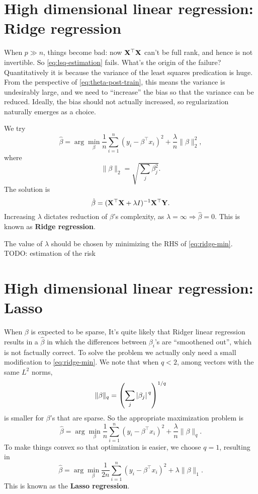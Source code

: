 \documentclass[hyperref, a4paper]{article}
\newcommand*{\argmin}{\arg\min}
\newcommand*{\concept}[1]{{\textbf{#1}}}
\begin{document}
\section{High dimensional linear regression: Ridge regression}

When $p \gg n$, things become bad: now $\vb{X}^\top \vb{X}$ can't be full rank,
and hence is not invertible.
So \eqref{eq:lsq-estimation} fails.
What's the origin of the failure?
Quantitatively it is because the variance of the least squares predication is huge.
From the perspective of \eqref{eq:theta-post-train},
this means the variance is undesirably large,
and we need to ``increase'' the bias so that the variance can be reduced.
Ideally, the bias should not actually increased,
so regularization naturally emerges as a choice.

We try 
\begin{equation}
    \hat{\beta} = \argmin_{\beta} \frac{1}{n} \sum_{i=1}^{n} (y_i - \beta^\top x_i)^2 + \frac{\lambda}{n} \| \beta \|^2_2,
    \label{eq:ridge-min}
\end{equation}
where 
\begin{equation}
    \| \beta \|_2 = \sqrt{\sum_j \beta_j^2}.
\end{equation}
The solution is 
\begin{equation}
    \hat{\beta} = (\vb{X}^\top \vb{X} + \lambda I)^{-1} \vb{X}^\top \vb{Y}.
\end{equation}
Increasing $\lambda$ dictates reduction of $\beta$'s complexity,
as $\lambda = \infty \Rightarrow \hat{\beta} = 0$.
This is known as \concept{Ridge regression}.

The value of $\lambda$ should be chosen by minimizing the RHS of \eqref{eq:ridge-min}. TODO: estimation of the risk 

\section{High dimensional linear regression: Lasso}

When $\beta$ is expected to be sparse,
It's quite likely that Ridger linear regression results in a $\hat{\beta}$
in which the differences between $\beta_i$'s are ``smoothened out'',
which is not factually correct.
To solve the problem we actually only need a small modification to \eqref{eq:ridge-min}.
We note that when $q < 2$, among vectors with the same $L^2$ norms,
\begin{equation}
    \| \beta \|_q = \left( \sum_j \abs*{\beta_j}^q \right)^{1/q}
\end{equation}
is smaller for $\beta$'s that are sparse.
So the appropriate maximization problem is 
\begin{equation}
    \hat{\beta} = \argmin_{\beta} \frac{1}{n} \sum_{i=1}^{n} (y_i - \beta^\top x_i)^2 + \frac{\lambda}{n} \| \beta \|_q.
\end{equation}
To make things convex so that optimization is easier, we choose $q = 1$,
resulting in 
\begin{equation}
    \hat{\beta} = \argmin_{\beta} \frac{1}{2n} \sum_{i=1}^{n} (y_i - \beta^\top x_i)^2 + \lambda \| \beta \|_1.
\end{equation}
This is known as the \concept{Lasso regression}.
\end{document}
